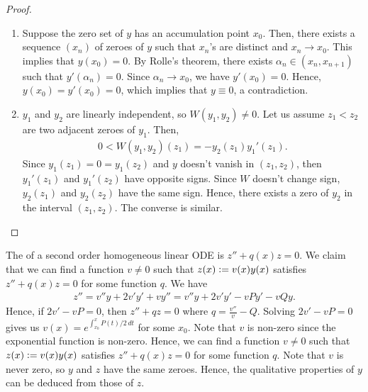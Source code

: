 \begin{proof}
    \begin{enumerate}[label=\arabic*.]
        \item Suppose the zero set of $y$ has an accumulation point $x_{0}$. Then, there exists a sequence $(x_{n})$ of zeroes of $y$ such that $x_{n}$'s are distinct and $x_{n} \to x_{0}$. This implies that $y(x_{0}) = 0$. By Rolle's theorem, there exists $\alpha_{n} \in (x_{n},x_{n+1})$ such that $y'(\alpha_{n}) = 0$. Since $\alpha_{n} \to x_{0}$, we have $y'(x_{0}) = 0$. Hence, $y(x_{0}) = y'(x_{0}) = 0$, which implies that $y \equiv 0$, a contradiction.
        \item $y_{1}$ and $y_{2}$ are linearly independent, so $W(y_{1},y_{2}) \neq 0$. Let us assume $z_{1} < z_{2}$ are two adjacent zeroes of $y_{1}$. Then,
        \begin{align}
            0 < W(y_{1},y_{2})(z_{1}) = -y_{2}(z_{1}) y_{1}'(z_{1}).
        \end{align}
        Since $y_{1}(z_{1}) = 0 = y_{1}(z_{2})$ and $y$ doesn't vanish in $(z_{1},z_{2})$, then $y_{1}'(z_{1})$ and $y_{1}'(z_{2})$ have opposite signs. Since $W$ doesn't change sign, $y_{2}(z_{1})$ and $y_{2}(z_{2})$ have the same sign. Hence, there exists a zero of $y_{2}$ in the interval $(z_{1},z_{2})$. The converse is similar.
    \end{enumerate}
\end{proof}

The  of a second order homogeneous linear ODE is $z'' + q(x)z = 0$. We claim that we can find a function $v \neq 0$ such that $z(x) \vcentcolon= v(x)y(x)$ satisfies $z'' + q(x) z = 0$ for some function $q$. We have
\begin{align}
    z'' = v'' y + 2v' y' + v y'' = v'' y + 2v' y' - v P y' - v Q y.
\end{align}
Hence, if $2v' - vP = 0$, then $z'' + q z = 0$ where $q = \frac{v''}{v} - Q$. Solving $2v' - vP = 0$ gives us $v(x) = e^{\int_{x_{0}}^{x} P(t)/2 \, dt}$ for some $x_{0}$. Note that $v$ is non-zero since the exponential function is non-zero. Hence, we can find a function $v \neq 0$ such that $z(x) \vcentcolon= v(x)y(x)$ satisfies $z'' + q(x) z = 0$ for some function $q$. Note that $v$ is never zero, so $y$ and $z$ have the same zeroes. Hence, the qualitative properties of $y$ can be deduced from those of $z$. 

